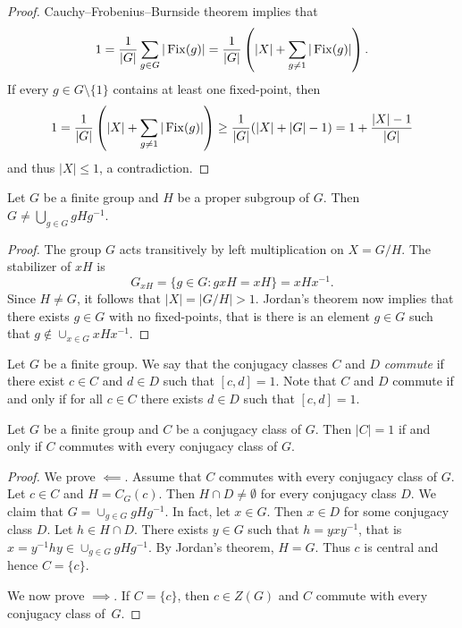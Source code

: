 \begin{proof}
    Cauchy--Frobenius--Burnside theorem implies that
    \[
    1=\frac{1}{|G|}\sum_{g\in G}|\operatorname{Fix}(g)|=\frac{1}{|G|}\left(|X|+\sum_{g\ne 1}|\operatorname{Fix}(g)|\right).
    \]
    If every $g\in G\setminus\{1\}$ contains at least one fixed-point, then
    \[
    1=\frac{1}{|G|}\left(|X|+\sum_{g\ne 1}|\operatorname{Fix}(g)|\right)\geq \frac{1}{|G|}(|X|+|G|-1)=1+\frac{|X|-1}{|G|}
    \]
    and thus $|X|\leq1$, a contradiction. 
\end{proof}

\begin{corollary}
    Let $G$ be a finite group and $H$ be a proper subgroup of $G$. 
    Then $G\ne\bigcup_{g\in G}gHg^{-1}$.
\end{corollary}

\begin{proof}
    The group $G$ acts transitively by left multiplication on $X=G/H$. The stabilizer
    of $xH$ is 
    \[
    G_{xH}=\{g\in G:gxH=xH\}=xHx^{-1}.
    \]
    Since $H\ne G$, it follows that $|X|=|G/H|>1$. Jordan's theorem now implies
    that there exists $g\in G$ with no fixed-points, that is 
    there is an element $g\in G$ such that $g\not\in\cup_{x\in G}xHx^{-1}$. 
\end{proof}

Let $G$ be a finite group. We say that the conjugacy classes $C$ and $D$ 
\emph{commute} if there exist 
$c\in C$ and $d\in D$ such that $[c,d]=1$. 
Note that $C$ and $D$ commute if and only if for all $c\in C$ there exists $d\in D$ 
such that $[c,d]=1$. 

\begin{corollary}[Wildon]
    Let $G$ be a finite group and $C$ be a conjugacy class of $G$. 
    Then $|C|=1$ if and only if $C$ commutes 
    with every conjugacy class of $G$.
\end{corollary}
    
\begin{proof}
    We prove $\impliedby$. 
    Assume that $C$ commutes with every conjugacy class of $G$. 
    Let $c\in C$ and $H=C_G(c)$. Then $H\cap D\ne\emptyset$ for every conjugacy class
    $D$. We claim that $G=\cup_{g\in G}gHg^{-1}$. In fact, let $x\in G$. Then
    $x\in D$ 
    for some conjugacy class $D$. 
    Let 
    $h\in H\cap D$. There exists $y\in G$ such that $h=yxy^{-1}$, that is
    $x=y^{-1}hy\in \cup_{g\in G}gHg^{-1}$. By Jordan's theorem,  
    $H=G$. Thus $c$ is central and hence $C=\{c\}$. 
    
    We now prove $\implies$. If $C=\{c\}$, then $c\in Z(G)$ and $C$ commute with every 
    conjugacy class of~$G$. 
\end{proof}

